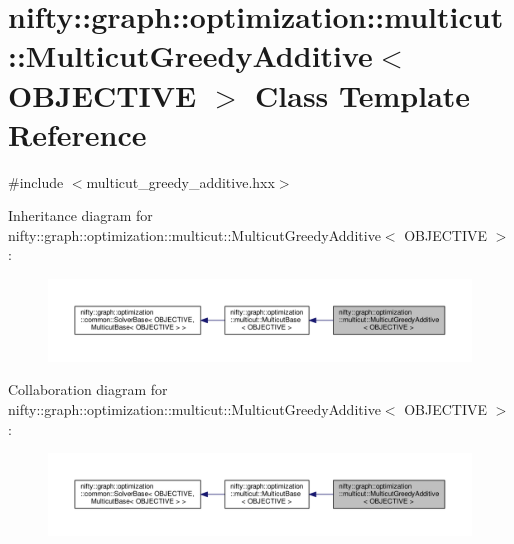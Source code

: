 \hypertarget{classnifty_1_1graph_1_1optimization_1_1multicut_1_1MulticutGreedyAdditive}{}\section{nifty\+:\+:graph\+:\+:optimization\+:\+:multicut\+:\+:Multicut\+Greedy\+Additive$<$ O\+B\+J\+E\+C\+T\+I\+V\+E $>$ Class Template Reference}
\label{classnifty_1_1graph_1_1optimization_1_1multicut_1_1MulticutGreedyAdditive}


{\ttfamily \#include $<$multicut\+\_\+greedy\+\_\+additive.\+hxx$>$}



Inheritance diagram for nifty\+:\+:graph\+:\+:optimization\+:\+:multicut\+:\+:Multicut\+Greedy\+Additive$<$ O\+B\+J\+E\+C\+T\+I\+V\+E $>$\+:\nopagebreak
\begin{figure}[H]
\begin{center}
\leavevmode
\includegraphics[width=350pt]{classnifty_1_1graph_1_1optimization_1_1multicut_1_1MulticutGreedyAdditive__inherit__graph}
\end{center}
\end{figure}


Collaboration diagram for nifty\+:\+:graph\+:\+:optimization\+:\+:multicut\+:\+:Multicut\+Greedy\+Additive$<$ O\+B\+J\+E\+C\+T\+I\+V\+E $>$\+:\nopagebreak
\begin{figure}[H]
\begin{center}
\leavevmode
\includegraphics[width=350pt]{classnifty_1_1graph_1_1optimization_1_1multicut_1_1MulticutGreedyAdditive__coll__graph}
\end{center}
\end{figure}
